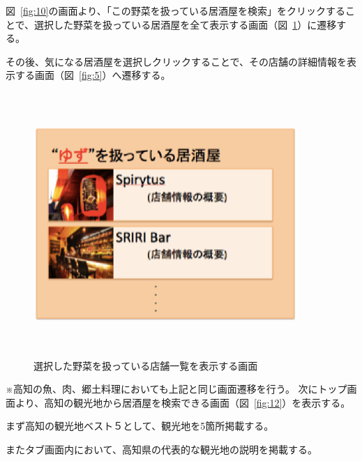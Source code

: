 \documentclass[a4j,titlepage]{jarticle}
\begin{document}
図~\ref{fig:10}の画面より、「この野菜を扱っている居酒屋を検索」をクリックすることで、選択した野菜を扱っている居酒屋を全て表示する画面（図~\ref{fig:11}）に遷移する。



その後、気になる居酒屋を選択しクリックすることで、その店舗の詳細情報を表示する画面（図~\ref{fig:5}）へ遷移する。
\clearpage
\begin {figure}[!htbp]
    \begin{center}
    \includegraphics [height=10cm, width=10cm]{11.eps}
    \caption {選択した野菜を扱っている店舗一覧を表示する画面}
    \label {fig:11}
    \end{center}
\end {figure}

※高知の魚、肉、郷土料理においても上記と同じ画面遷移を行う。
次にトップ画面より、高知の観光地から居酒屋を検索できる画面（図~\ref{fig:12}）を表示する。



まず高知の観光地ベスト５として、観光地を5箇所掲載する。



またタブ画面内において、高知県の代表的な観光地の説明を掲載する。
\end{document}
